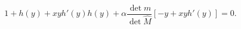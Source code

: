 \begin{equation}
  \label{eq:38}
  1 + h(y) + x y h'(y) h(y) + \alpha \frac{\det m}{\det \hat{M}}
  [-y+xyh'(y)] = 0.
\end{equation}

